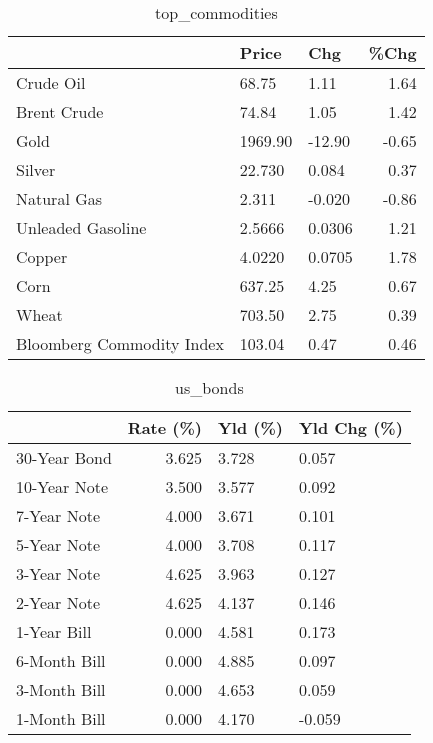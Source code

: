 \documentclass{article}%
\begin{document}
\begin{table}[htbp]%
\caption{top\_commodities}%
\centering%
\begin{adjustbox}{width=1\textwidth}%
\begin{tabular}{lllr}
\toprule
                          &   Price &    Chg &  \%Chg \\
\midrule
               Crude Oil  &   68.75 &   1.11 &  1.64 \\
             Brent Crude  &   74.84 &   1.05 &  1.42 \\
                    Gold  & 1969.90 & -12.90 & -0.65 \\
                  Silver  &  22.730 &  0.084 &  0.37 \\
             Natural Gas  &   2.311 & -0.020 & -0.86 \\
       Unleaded Gasoline  &  2.5666 & 0.0306 &  1.21 \\
                  Copper  &  4.0220 & 0.0705 &  1.78 \\
                    Corn  &  637.25 &   4.25 &  0.67 \\
                   Wheat  &  703.50 &   2.75 &  0.39 \\
Bloomberg Commodity Index &  103.04 &   0.47 &  0.46 \\
\bottomrule
\end{tabular}
%
\end{adjustbox}%
\end{table}

%


\begin{table}[htbp]%
\caption{us\_bonds}%
\centering%
\begin{adjustbox}{width=1\textwidth}%
\begin{tabular}{lrll}
\toprule
             &  Rate (\%) & Yld (\%) & Yld Chg (\%) \\
\midrule
30-Year Bond &     3.625 &   3.728 &       0.057 \\
10-Year Note &     3.500 &   3.577 &       0.092 \\
 7-Year Note &     4.000 &   3.671 &       0.101 \\
 5-Year Note &     4.000 &   3.708 &       0.117 \\
 3-Year Note &     4.625 &   3.963 &       0.127 \\
 2-Year Note &     4.625 &   4.137 &       0.146 \\
 1-Year Bill &     0.000 &   4.581 &       0.173 \\
6-Month Bill &     0.000 &   4.885 &       0.097 \\
3-Month Bill &     0.000 &   4.653 &       0.059 \\
1-Month Bill &     0.000 &   4.170 &      -0.059 \\
\bottomrule
\end{tabular}
%
\end{adjustbox}%
\end{table}
\end{document}
